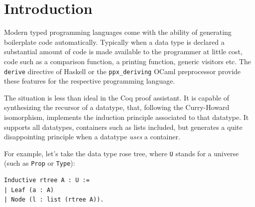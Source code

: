 \documentclass[sigplan,10pt,review]{acmart}\settopmatter{printfolios=true,printccs=false,printacmref=false}
\begin{document}


\maketitle

\section{Introduction}

Modern typed programming languages come with the ability of generating
boilerplate code automatically. Typically when a data type is declared
a substantial amount of code is made available to the programmer at
little cost, code such as a comparison function, a printing function,
generic visitors etc.  The \lstinline+derive+ directive of Haskell or the
\lstinline+ppx_deriving+ OCaml preprocessor provide these features for the
respective programming language.

The situation is less than ideal in the Coq proof assistant.  It is
capable of synthesizing the recursor of a datatype, that,
following the Curry-Howard isomorphism, implements the induction
principle associated to that datatype. It supports all datatypes,
containers such as lists included, but generates a quite disappointing
principle when a datatype \emph{uses} a container.

For example, let's take the data type rose tree, where \lstinline+U+
stands for a universe (such as \lstinline+Prop+ or \lstinline+Type+):

\begin{minipage}{\textwidth}\begin{lstlisting}
Inductive rtree A : U :=
| Leaf (a : A)
| Node (l : list (rtree A)).
\end{lstlisting}\end{minipage}
\end{document}
